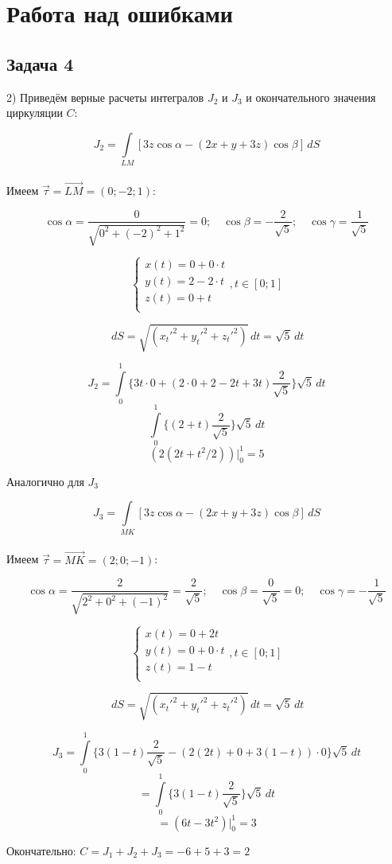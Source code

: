 \documentclass[12pt]{article}
\begin{document}
	\newpage
	\section*{Работа над ошибками}
	\subsection*{Задача 4}
	
	2) Приведём верные расчеты интегралов $ J_2 $ и $ J_3 $ и окончательного значения циркуляции $ C $: 

	$$J_2 = \int \limits_{LM} [3z\cos\alpha -(2x + y + 3z)\cos\beta]\,dS$$\\
		Имеем $ \vec{\tau} = \vec{LM} = (0;-2;1) $:

		$$\cos\alpha = \frac{0}{\sqrt{0^2 + (-2)^2+1^2}} = 0;\quad \cos\beta = -\frac{2}{\sqrt{5}};\quad \cos\gamma = \frac{1}{\sqrt{5}}$$
		
		$$\begin{cases}
			x(t) = 0 + 0\cdot t\\
			y(t) = 2 - 2\cdot t\\
			z(t) = 0 + t\\
		\end{cases}, t \in [0;1]$$
		
		$$\,dS = \sqrt{(x_t'^2 + y_t'^2 + z_t'^2 )} \,dt = \sqrt{5} \,dt$$  

		$$J_2 = \int \limits_{0}^1 \bigg\{ 3t\cdot 0 + (2 \cdot 0 + 2 -2t  + 3t)\frac{2}{\sqrt{5}}  \bigg\}\sqrt{5} \,dt$$
		$$ \int \limits_{0}^1 \bigg\{ (2 + t)\frac{2}{\sqrt{5}}  \bigg\}\sqrt{5} \,dt $$
		$$ (2 (2 t + t^2/2)) \Big|_0^{1} = 5 $$

		\newpage

		Аналогично для $ J_3 $ 

		$$J_3 = \int \limits_{MK} [3z\cos\alpha -(2x + y + 3z)\cos\beta]\,dS$$\\
		Имеем $ \vec{\tau} = \vec{MK} = (2;0;-1) $:

		$$\cos\alpha = \frac{2}{\sqrt{2^2+0^2+(-1)^2}} = \frac{2}{\sqrt{5}};\quad \cos\beta = \frac{0}{\sqrt{5}}=0;\quad \cos\gamma = -\frac{1}{\sqrt{5}}$$
		
		$$\begin{cases}
			x(t) = 0 + 2t\\
			y(t) = 0 + 0\cdot t\\
			z(t) = 1 -t\\
		\end{cases}, t \in [0;1]$$
		
		$$\,dS = \sqrt{(x_t'^2 + y_t'^2 + z_t'^2 )} \,dt = \sqrt{5} \,dt$$  

		$$J_3 = \int \limits_{0}^1 \bigg\{ 3(1-t)\frac{2}{\sqrt{5}} - (2(2t) + 0 + 3(1-t))\cdot0 \bigg\}\sqrt{5} \,dt$$
		$$= \int \limits_{0}^1 \bigg\{ 3(1-t)\frac{2}{\sqrt{5}} \bigg\}\sqrt{5} \,dt$$
		$$= (6 t - 3 t^2)\Big|_0^{1} = 3$$
		
		Окончательно: $ C = J_1 + J_2 + J_3  = -6 + 5 +  3 = 2$
\end{document}
